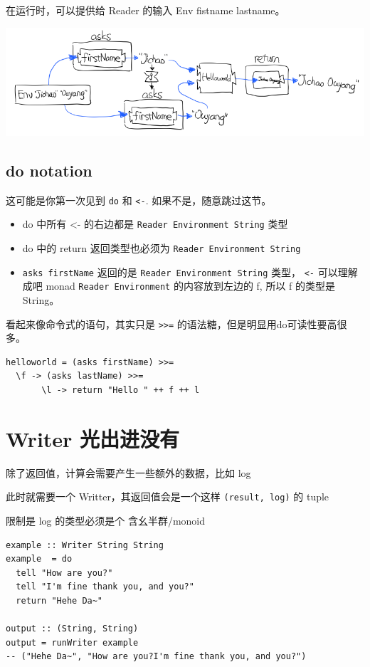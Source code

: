 \documentclass[11pt]{tufte-book}
\begin{document}
在运行时，可以提供给 Reader 的输入 Env fistname lastname。
\begin{center}
\includegraphics[width=.9\linewidth]{images/p2-reader-monad-run.png}
\end{center}

\section{do notation}
\label{sec:orgc161d0d}
这可能是你第一次见到 \texttt{do} 和 \texttt{<-}. 如果不是，随意跳过这节。

\begin{itemize}
\item do 中所有 <- 的右边都是 \texttt{Reader Environment String} 类型
\item do 中的 return 返回类型也必须为  \texttt{Reader Environment String}
\item \texttt{asks firstName} 返回的是 \texttt{Reader Environment String} 类型， \texttt{<-} 可以理解成吧 monad \texttt{Reader Environment} 的内容放到左边的 f, 所以 f 的类型是 String。
\end{itemize}

看起来像命令式的语句，其实只是 \texttt{>>=} 的语法糖，但是明显用do可读性要高很多。
\begin{verbatim}
helloworld = (asks firstName) >>=
  \f -> (asks lastName) >>=
       \l -> return "Hello " ++ f ++ l
\end{verbatim}


\chapter{Writer 光出进没有}
\label{sec:orgfc9110a}

除了返回值，计算会需要产生一些额外的数据，比如 log

此时就需要一个 Writter，其返回值会是一个这样 \texttt{(result, log)} 的 tuple

限制是 log 的类型必须是个 含幺半群/monoid

\begin{verbatim}
example :: Writer String String
example  = do
  tell "How are you?"
  tell "I'm fine thank you, and you?"
  return "Hehe Da~"

output :: (String, String)
output = runWriter example
-- ("Hehe Da~", "How are you?I'm fine thank you, and you?")
\end{verbatim}
\end{document}
